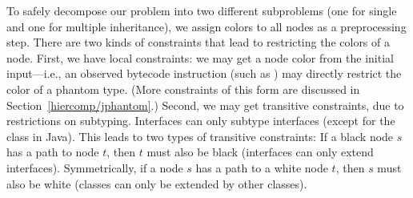 To safely decompose our problem into two different subproblems (one
for single and one for multiple inheritance), we assign colors to all
nodes as a preprocessing step. There are two kinds of constraints that
lead to restricting the colors of a node. First, we have local
constraints: we may get a node color from the initial input---i.e., an
observed bytecode instruction (such as ) may
directly restrict the color of a phantom type. (More constraints of
this form are discussed in Section~\ref{hiercomp/jphantom}.) Second, we may get
transitive constraints, due to restrictions on subtyping. Interfaces
can only subtype interfaces (except for the  class in
Java). This leads to two types of transitive constraints: If a black
node $s$ has a path to node $t$, then $t$ must also be black
(interfaces can only extend interfaces). Symmetrically, if a node $s$
has a path to a white node $t$, then $s$ must also be white (classes
can only be extended by other classes).




